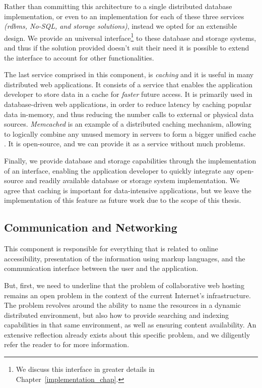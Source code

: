 \documentclass[12pt, titlepage]{uo_temp}
\begin{document}
     Rather than committing this architecture to a single distributed database
     implementation, or even to an implementation for each of these three services
     \emph{(\gls{rdbms}, No-SQL, and storage solutions)}, instead we opted for an
     extensible design. We provide an universal interface\footnote{We discuss this
       interface in greater details in Chapter~\ref{implementation_chap}.} to these
     database and storage systems, and thus if the solution provided doesn't suit their
     need it is possible to extend the interface to account for other functionalities.
     
     The last service comprised in this component, is \emph{caching} and it is useful in
     many distributed web applications. It consists of a service that enables the
     application developer to store data in a cache for \emph{faster} future access. It is
     primarily used in database-driven web applications, in order to reduce latency by
     caching popular data in-memory, and thus reducing the number calls to external or
     physical data sources. \emph{Memcached} is an example of a distributed caching
     mechanism, allowing to logically combine any unused memory in servers to form a
     bigger unified cache \cite{fitzpatrick2011memcached}. It is open-source, and we can
     provide it as a service without much problems.

     Finally, we provide database and storage capabilities through the implementation of
     an interface, enabling the application developer to quickly integrate any open-source
     and readily available database or storage system implementation. We agree that
     caching is important for data-intensive applications, but we leave the implementation
     of this feature as future work due to the scope of this thesis.
     
     \subsection{Communication and Networking}\label{arch_comm}
     This component is responsible for everything that is related to online accessibility,
     presentation of the information using markup languages, and the communication interface
     between the user and the application.

     But, first, we need to underline that the problem of collaborative web hosting
     remains an open problem in the context of the current Internet's infrastructure. The
     problem revolves around the ability to name the resources in a dynamic distributed
     environment, but also how to provide searching and indexing capabilities in that same
     environment, as well as ensuring content availability.  An extensive reflection
     already exists about this specific problem, and we diligently refer the reader to
     \cite{ahmed2014collaborative} for more information.
     
\end{document}
